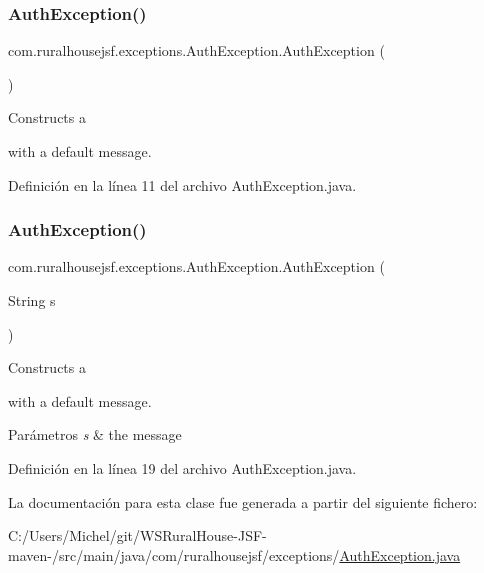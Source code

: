 \subsubsection{\texorpdfstring{AuthException()}{AuthException()}\hspace{0.1cm}{\footnotesize\ttfamily [1/2]}}
{\footnotesize\ttfamily com.\+ruralhousejsf.\+exceptions.\+Auth\+Exception.\+Auth\+Exception (\begin{DoxyParamCaption}{ }\end{DoxyParamCaption})}

Constructs a
\begin{DoxyCode}{0}
\end{DoxyCode}
 with a default message. 

Definición en la línea 11 del archivo Auth\+Exception.\+java.

\mbox{\label{classcom_1_1ruralhousejsf_1_1exceptions_1_1_auth_exception_ac4b5a1b9673da9a2de397154017a0c1e}} 
\subsubsection{\texorpdfstring{AuthException()}{AuthException()}\hspace{0.1cm}{\footnotesize\ttfamily [2/2]}}
{\footnotesize\ttfamily com.\+ruralhousejsf.\+exceptions.\+Auth\+Exception.\+Auth\+Exception (\begin{DoxyParamCaption}\item[{String}]{s }\end{DoxyParamCaption})}

Constructs a
\begin{DoxyCode}{0}
\end{DoxyCode}
 with a default message. 
\begin{DoxyParams}{Parámetros}
{\em s} & the message \\
\hline
\end{DoxyParams}


Definición en la línea 19 del archivo Auth\+Exception.\+java.



La documentación para esta clase fue generada a partir del siguiente fichero\+:\begin{DoxyCompactItemize}
\item 
C\+:/\+Users/\+Michel/git/\+W\+S\+Rural\+House-\/\+J\+S\+F-\/maven-\//src/main/java/com/ruralhousejsf/exceptions/\mbox{\hyperlink{_auth_exception_8java}{Auth\+Exception.\+java}}\end{DoxyCompactItemize}
